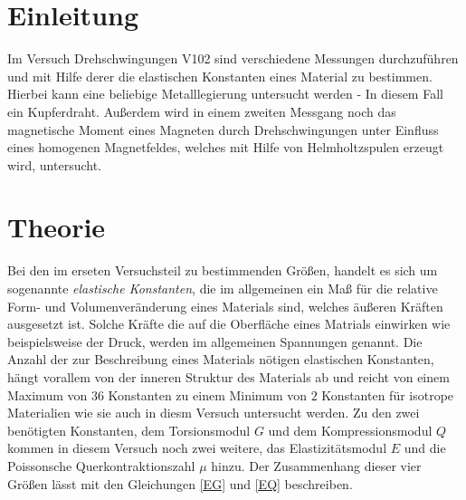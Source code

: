 



  \section{Einleitung}
    Im Versuch Drehschwingungen V102 sind verschiedene Messungen durchzuführen und mit Hilfe 
    derer die elastischen Konstanten eines Material zu bestimmen. Hierbei kann eine beliebige Metalllegierung 
    untersucht werden - In diesem Fall ein Kupferdraht. 
    Außerdem wird in einem zweiten Messgang noch das magnetische Moment eines Magneten durch 
    Drehschwingungen unter Einfluss eines homogenen Magnetfeldes, welches mit Hilfe von Helmholtzspulen erzeugt wird, untersucht.


  
  
  
  
  
    
    
    
    
    
    
  \section{Theorie}
    Bei den im erseten Versuchsteil zu bestimmenden Größen, handelt es sich um sogenannte \emph{elastische Konstanten},
    die im allgemeinen ein Maß für die relative Form- und Volumenveränderung eines Materials sind, welches äußeren Kräften
    ausgesetzt ist. Solche Kräfte die auf die Oberfläche eines Matrials einwirken wie beispielsweise der Druck, werden
    im allgemeinen Spannungen genannt. Die Anzahl der zur Beschreibung eines Materials nötigen elastischen Konstanten, 
    hängt vorallem von der inneren Struktur des Materials ab und reicht von einem Maximum von $36$ Konstanten zu einem
    Minimum von $2$ Konstanten für isotrope Materialien wie sie auch in diesm Versuch untersucht werden.
    Zu den zwei benötigten Konstanten, dem Torsionsmodul $G$ und dem Kompressionsmodul $Q$ kommen in diesem Versuch
    noch zwei weitere, das Elastizitätsmodul $E$ und die Poissonsche Querkontraktionszahl $\mu$ hinzu.
    Der Zusammenhang dieser vier Größen lässt mit den Gleichungen \ref{EG} und \ref{EQ} beschreiben.
    

